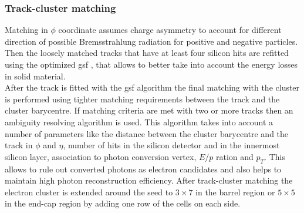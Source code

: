  	\subsubsection{Track-cluster matching}
 	Matching in $\phi$ coordinate assumes charge asymmetry to account for different direction of possible Bremsstrahlung radiation for positive and negative particles. Then the loosely matched tracks that have at least four silicon hits are refitted using the optimized \gls{gsf} \cite{GSF}, that allows to better take into account the energy losses in solid material.\\
 	After the track is fitted with the \gls{gsf} algorithm the final matching with the cluster is performed using tighter matching requirements between the track and the cluster barycentre. If matching criteria are met with two or more tracks then an ambiguity resolving algorithm is used. This algorithm takes into account a number of parameters like the distance between the cluster barycentre and the track in $\phi$ and $\eta$, number of hits in the silicon detector and in the innermost silicon layer, association to photon conversion vertex, $E/p$ ration and $p_T$. This allows to rule out converted photons as electron candidates and also helps to maintain high photon reconstruction efficiency. After track-cluster matching the electron cluster is extended around the seed to $3 \times 7$ in the barrel region or $5\times 5$ in the end-cap region by adding one row of the cells on each side. \\
